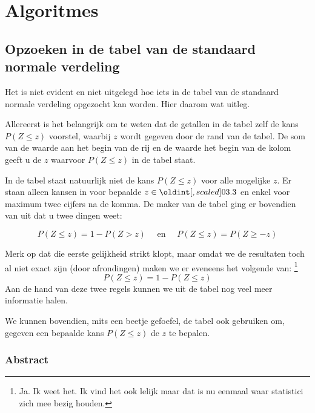 \documentclass[main.tex]{subfiles}
\begin{document}
\chapter{Algoritmes}
\label{cha:algoritmes}

\section{Opzoeken in de tabel van de standaard normale verdeling}
Het is niet evident en niet uitgelegd hoe iets in de tabel van de standaard normale verdeling opgezocht kan worden. 
Hier daarom wat uitleg.

Allereerst is het belangrijk om te weten dat de getallen in de tabel zelf de kans $P(Z \le z)$ voorstel, waarbij $z$ wordt gegeven door de rand van de tabel.
De som van de waarde aan het begin van de rij en de waarde het begin van de kolom geeft u de $z$ waarvoor $P(Z \le z)$ in de tabel staat.

In de tabel staat natuurlijk niet de kans $P(Z \le z)$ voor alle mogelijke $z$.
Er staan alleen kansen in voor bepaalde $z \in \interval{0}{3.3}$ en enkel voor maximum twee cijfers na de komma.
De maker van de tabel ging er bovendien van uit dat u twee dingen weet:

\[ P(Z \le z) = 1 - P(Z > z) \quad\text{ en }\quad P(Z \le z) = P(Z \ge -z) \]

Merk op dat die eerste gelijkheid strikt klopt, maar omdat we de resultaten toch al niet exact zijn (door afrondingen) maken we er eveneens het volgende van:
\footnote{Ja. Ik weet het. Ik vind het ook lelijk maar dat is nu eenmaal waar statistici zich mee bezig houden.}
\[ P(Z \le z) = 1 - P(Z \le z) \]
Aan de hand van deze twee regels kunnen we uit de tabel nog veel meer informatie halen.

We kunnen bovendien, mits een beetje gefoefel, de tabel ook gebruiken om, gegeven een bepaalde kans $P(Z \le z)$ de $z$ te bepalen. 

\subsection*{Abstract}
\end{document}
